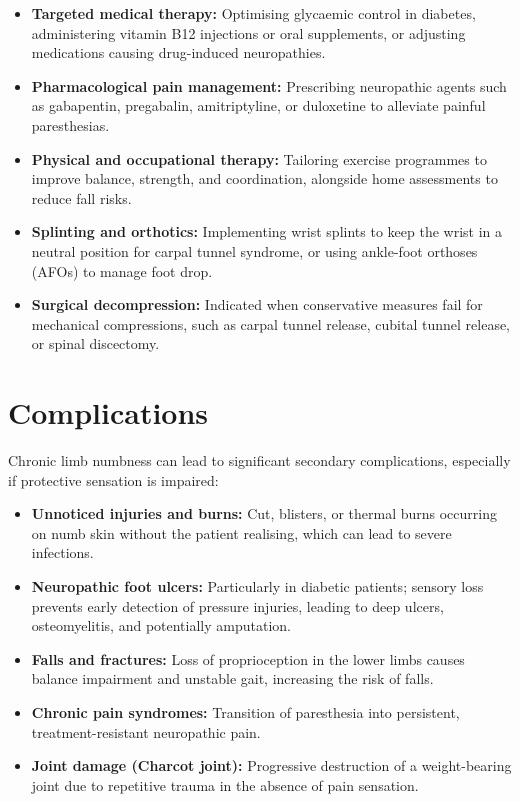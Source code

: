 \begin{itemize}
    \item \textbf{Targeted medical therapy:} Optimising glycaemic control in diabetes, administering vitamin B12 injections or oral supplements, or adjusting medications causing drug-induced neuropathies.
    \item \textbf{Pharmacological pain management:} Prescribing neuropathic agents such as gabapentin, pregabalin, amitriptyline, or duloxetine to alleviate painful paresthesias.
    \item \textbf{Physical and occupational therapy:} Tailoring exercise programmes to improve balance, strength, and coordination, alongside home assessments to reduce fall risks.
    \item \textbf{Splinting and orthotics:} Implementing wrist splints to keep the wrist in a neutral position for carpal tunnel syndrome, or using ankle-foot orthoses (AFOs) to manage foot drop.
    \item \textbf{Surgical decompression:} Indicated when conservative measures fail for mechanical compressions, such as carpal tunnel release, cubital tunnel release, or spinal discectomy.
\end{itemize}

\section*{Complications}
Chronic limb numbness can lead to significant secondary complications, especially if protective sensation is impaired:

\begin{itemize}
    \item \textbf{Unnoticed injuries and burns:} Cut, blisters, or thermal burns occurring on numb skin without the patient realising, which can lead to severe infections.
    \item \textbf{Neuropathic foot ulcers:} Particularly in diabetic patients; sensory loss prevents early detection of pressure injuries, leading to deep ulcers, osteomyelitis, and potentially amputation.
    \item \textbf{Falls and fractures:} Loss of proprioception in the lower limbs causes balance impairment and unstable gait, increasing the risk of falls.
    \item \textbf{Chronic pain syndromes:} Transition of paresthesia into persistent, treatment-resistant neuropathic pain.
    \item \textbf{Joint damage (Charcot joint):} Progressive destruction of a weight-bearing joint due to repetitive trauma in the absence of pain sensation.
\end{itemize}

